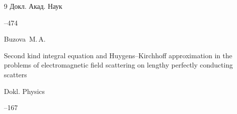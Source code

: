 \begin{thebibliography}{9}
\jour Докл. Акад. Наук




--474

\transl

\by Buzova~M.\,A. 

\paper Second kind integral equation and Huygens--Kirchhoff approximation in the problems of electromagnetic field scattering on lengthy perfectly conducting scatters

\jour Dokl. Physics




--167



\end{thebibliography}





\hskip6.5cm \thedate \par

\hskip6.5cm\therevdate\par



\vspace{-8mm}



\makeengtitle



\newpage



%

% 